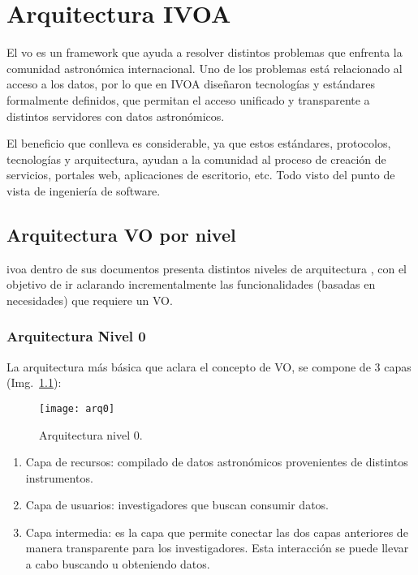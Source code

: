 \chapter{Arquitectura IVOA}

El \gls{vo} es un framework que ayuda a resolver distintos problemas que enfrenta la comunidad astronómica internacional. Uno de los problemas está relacionado al acceso a los datos, por lo que en IVOA diseñaron tecnologías y estándares formalmente definidos, que permitan el acceso unificado y transparente a distintos servidores con datos astronómicos.

El beneficio que conlleva es considerable, ya que estos estándares, protocolos, tecnologías y arquitectura, ayudan a la comunidad al proceso de creación de servicios, portales web, aplicaciones de escritorio, etc. Todo visto del punto de vista de ingeniería de software.

\section{Arquitectura VO por nivel}

\gls{ivoa} dentro de sus documentos presenta distintos niveles de arquitectura \cite{ivoaArq}, con el objetivo de ir aclarando incrementalmente las funcionalidades (basadas en necesidades) que requiere un VO.

\subsection{Arquitectura Nivel 0}

La arquitectura más básica que aclara el concepto de VO, se compone de 3 capas (Img.~\ref{img:arq0}):

\begin{figure}[ht!]
	\centering
	\texttt{[image: arq0]}
	\caption{Arquitectura nivel 0.}
	\label{img:arq0}
\end{figure}

\begin{enumerate}
	\item Capa de recursos: compilado de datos astronómicos provenientes de distintos instrumentos.
	\item Capa de usuarios: investigadores que buscan consumir datos.
	\item Capa intermedia: es la capa que permite conectar las dos capas anteriores de manera transparente para los investigadores. Esta interacción se puede llevar a cabo buscando u obteniendo datos.
\end{enumerate}

